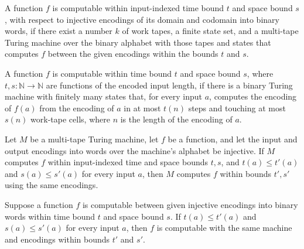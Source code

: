 \begin{definition}
\label{Turing.MultiTapeTM.ComputableInTimeAndSpace}
\leanok
{}
A function $f$ is computable within input-indexed time bound $t$ and space
bound $s$, with respect to injective encodings of its domain and codomain into
binary words, if there exist a number $k$ of work tapes, a finite state set,
and a multi-tape Turing machine over the binary alphabet with those tapes and
states that computes $f$ between the given encodings within the bounds $t$
and $s$.
\end{definition}

\begin{definition}
\label{Turing.MultiTapeTM.ComputableInTimeAndSpaceOfLength}
\leanok
{}
A function $f$ is computable within time bound $t$ and space bound $s$, where
$t, s : \mathbb{N} \to \mathbb{N}$ are functions of the encoded input length,
if there is a binary Turing machine with finitely many states that, for every
input $a$, computes the encoding of $f(a)$ from the encoding of $a$ in at most
$t(n)$ steps and touching at most $s(n)$ work-tape cells, where $n$ is the
length of the encoding of $a$.
\end{definition}

\begin{theorem}
\label{Turing.MultiTapeTM.ComputesFunInTimeAndSpace.mono}
\leanok
{}
Let $M$ be a multi-tape Turing machine, let $f$ be a function, and let the input and
output encodings into words over the machine's alphabet be injective. If $M$ computes
$f$ within input-indexed time and space bounds $t,s$, and $t(a)\le t'(a)$ and $s(a)\le
s'(a)$ for every input $a$, then $M$ computes $f$ within bounds $t',s'$ using the same
encodings.
\end{theorem}

\begin{theorem}
\label{Turing.MultiTapeTM.ComputableInTimeAndSpace.mono}
\leanok
{}
Suppose a function $f$ is computable between given injective encodings into binary words
within time bound $t$ and space bound $s$. If $t(a)\le t'(a)$ and $s(a)\le s'(a)$ for
every input $a$, then $f$ is computable with the same machine and encodings within
bounds $t'$ and $s'$.
\end{theorem}

